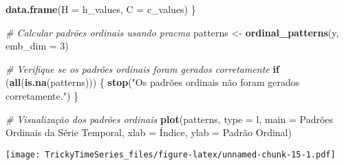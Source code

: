 \documentclass[
]{article}
\newenvironment{Shaded}{\begin{snugshade}}{\end{snugshade}}
\newcommand{\AttributeTok}[1]{\textcolor[rgb]{0.13,0.29,0.53}{#1}}
\newcommand{\CommentTok}[1]{\textcolor[rgb]{0.56,0.35,0.01}{\textit{#1}}}
\newcommand{\ControlFlowTok}[1]{\textcolor[rgb]{0.13,0.29,0.53}{\textbf{#1}}}
\newcommand{\DecValTok}[1]{\textcolor[rgb]{0.00,0.00,0.81}{#1}}
\newcommand{\FloatTok}[1]{\textcolor[rgb]{0.00,0.00,0.81}{#1}}
\newcommand{\FunctionTok}[1]{\textcolor[rgb]{0.13,0.29,0.53}{\textbf{#1}}}
\newcommand{\NormalTok}[1]{#1}
\newcommand{\OtherTok}[1]{\textcolor[rgb]{0.56,0.35,0.01}{#1}}
\newcommand{\SpecialCharTok}[1]{\textcolor[rgb]{0.81,0.36,0.00}{\textbf{#1}}}
\newcommand{\StringTok}[1]{\textcolor[rgb]{0.31,0.60,0.02}{#1}}
\begin{document}
\begin{Shaded}
\begin{Highlighting}[]
  \FunctionTok{data.frame}\NormalTok{(}\AttributeTok{H =}\NormalTok{ h\_values, }\AttributeTok{C =}\NormalTok{ c\_values)}
\NormalTok{\}}

\CommentTok{\# Calcular padrões ordinais usando pracma}
\NormalTok{patterns }\OtherTok{\textless{}{-}} \FunctionTok{ordinal\_patterns}\NormalTok{(y, }\AttributeTok{emb\_dim =} \DecValTok{3}\NormalTok{)}

\CommentTok{\# Verifique se os padrões ordinais foram gerados corretamente}
\ControlFlowTok{if}\NormalTok{ (}\FunctionTok{all}\NormalTok{(}\FunctionTok{is.na}\NormalTok{(patterns))) \{}
  \FunctionTok{stop}\NormalTok{(}\StringTok{"Os padrões ordinais não foram gerados corretamente."}\NormalTok{)}
\NormalTok{\}}

\CommentTok{\# Visualização dos padrões ordinais}
\FunctionTok{plot}\NormalTok{(patterns, }\AttributeTok{type =} \StringTok{\textquotesingle{}l\textquotesingle{}}\NormalTok{, }\AttributeTok{main =} \StringTok{\textquotesingle{}Padrões Ordinais da Série Temporal\textquotesingle{}}\NormalTok{, }\AttributeTok{xlab =} \StringTok{\textquotesingle{}Índice\textquotesingle{}}\NormalTok{, }\AttributeTok{ylab =} \StringTok{\textquotesingle{}Padrão Ordinal\textquotesingle{}}\NormalTok{)}
\end{Highlighting}
\end{Shaded}

\texttt{[image: TrickyTimeSeries\_files/figure-latex/unnamed-chunk-15-1.pdf]}

\begin{Shaded}
\end{Shaded}
\end{document}

